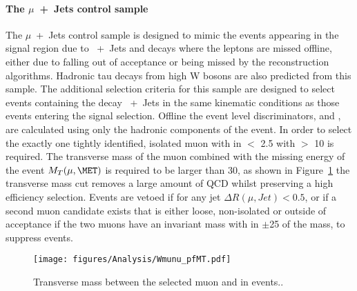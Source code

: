 \paragraph{The $\mu$~+~Jets control sample} %
\label{par:the_mu_jets_control_sample}
The $\mu$~+~Jets control sample is designed to mimic the events appearing in 
the signal region due to \HepProcess{\PW}~+~Jets and \HepProcess{\Ptop\APtop} 
decays where the leptons are missed offline, either due to falling out of 
acceptance or being missed by the reconstruction algorithms. Hadronic tau 
decays from high \PT W bosons are also predicted from this sample.
The additional selection criteria for this sample are designed to select events 
containing the decay \HepProcess{\PW\to\mu\nu}~+~Jets in the same kinematic 
conditions as those events entering the signal selection. Offline the event 
level discriminators, \HT and \alt, are calculated using only the hadronic 
components of the event. In order to select the \HepProcess{\PW} exactly one 
tightly identified, isolated muon with in \mETA $<$ 2.5 with \PT $>$ 
\unit{10}{\GeV} is required. The transverse mass of the muon combined with the 
missing energy of the event $M_{T}(\mu,\MET)$ is required to be larger than 
\unit{30}{\GeV}, as shown in Figure~\ref{fig:figures_Analysis_Wmunu_pfMT} the 
transverse mass cut removes a large amount of QCD whilst preserving a high 
efficiency \HepProcess{\PW} selection. Events are vetoed if for any jet $\Delta 
R(\mu,Jet) < 0.5$, or if a second muon candidate exists that is either loose, 
non-isolated or outside of acceptance if the two muons have an invariant mass 
with in $\pm$\unit{25}{\GeV} of the \PZ mass, to suppress 
\HepProcess{\PZ\to\mu\mu} events.


\begin{figure}[htbp]
  \centering
    \texttt{[image: figures/Analysis/Wmunu\_pfMT.pdf]}
  \caption{Transverse mass between the selected muon and \MET in 
           \HepProcess{\PW\to\mu\nu} events.\cite{CMS-AN-10-264}.}
  \label{fig:figures_Analysis_Wmunu_pfMT}
\end{figure}


